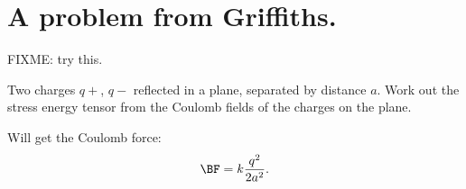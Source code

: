 %
%
%
\section{A problem from Griffiths.}
%
FIXME: try this.

Two charges \(q+\), \(q-\) reflected in a plane, separated by distance \(a\).  Work out the stress energy tensor from the Coulomb fields of the charges on the plane.

Will get the Coulomb force:
%
\begin{equation}\label{eqn:relativisticElectrodynamicsT9:330}
\BF = k \frac{q^2}{2 a^2}.
\end{equation}
%
